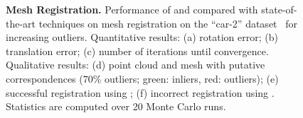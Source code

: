 \begin{figure}[h!]
\begin{center}
	\caption{{\bf Mesh Registration.} Performance of \GNCGM and \GNCTLS compared with state-of-the-art techniques on mesh registration on the \PASCALplus ``car-2'' dataset~\cite{Xiang2014WACV-PASCAL+} for increasing outliers.
     {
     Quantitative results: (a) rotation error; (b) translation error; (c) number of iterations until convergence.
     Qualitative results: (d)  point cloud and mesh with putative correspondences (70\% outliers; green: inliers, red: outliers); (e) successful registration using \GNCTLS; 
     (f) incorrect registration using \ransac.
     }
	Statistics are computed over 20 Monte Carlo runs.
	\label{fig:meshRegistration}}
	\vspace{-7.5mm} 
	\end{center}
\end{figure}



